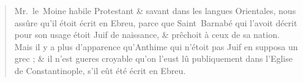\begin{quotation}
Mr.~le~Moine habile Protestant \& savant dans les langues Orientales, nous assûre qu'il étoit écrit en Ebreu, parce que Saint~Barnabé qui l'avoit décrit pour son usage étoit Juif de naissance, \& prêchoit à ceux de sa nation. Mais il y a plus d'apparence qu'Anthime qui n'étoit pas Juif en supposa un grec ; \& il n'est gueres croyable qu'on l'eust lû publiquement dans l'Eglise de Constantinople, s'il eût été écrit en Ebreu.
\end{quotation}